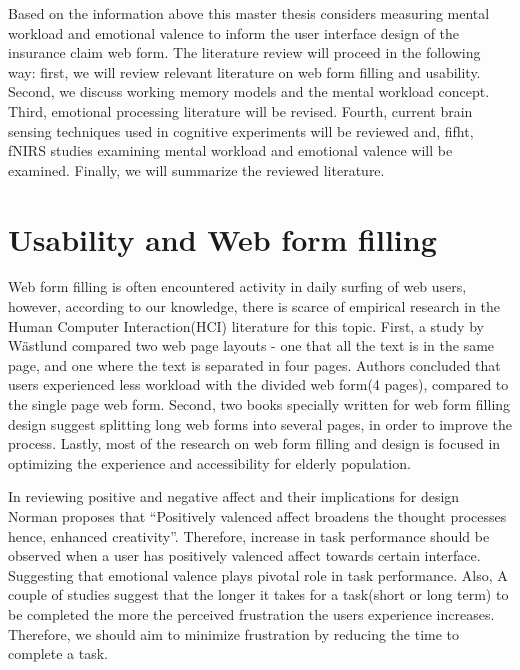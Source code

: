\documentclass[a4paper]{report}
\begin{document}
	Based on the information above this master thesis considers measuring mental workload and emotional valence to inform the user interface design of the insurance claim web form. The literature review will proceed in the following way: first, we will review relevant literature on web form filling and usability. Second, we discuss working memory models and the mental workload concept. Third, emotional processing literature will be revised. Fourth, current brain sensing techniques used in cognitive experiments will be reviewed and, fifht, fNIRS studies examining mental workload and emotional valence will be examined. Finally, we will summarize the reviewed literature. 
	
	\section{Usability and Web form filling}	
		Web form filling is often encountered activity in daily surfing of web users, however, according to our knowledge, there is scarce of empirical research in the Human Computer Interaction(HCI) literature for this topic. First, a study by Wästlund\cite{Wastlund20081229} compared two web page layouts - one that all the text is in the same page, and one where the text is separated in four pages. Authors concluded that users experienced less workload with the divided web form(4 pages), compared to the single page web form. Second, two books specially written for web form filling design\cite{jarrett2009forms,wroblewski2008web} suggest splitting long web forms into several pages, in order to improve the process. Lastly, most of the research on web form filling and design is focused in optimizing the experience and accessibility for elderly population\cite{sayago2012selective,chadwick2003web,lines2006online,sayago2007some}.
		
		In reviewing positive and negative affect and their implications for design Norman\cite{norman2002emotion} proposes that ``Positively valenced affect broadens the thought processes hence, enhanced creativity''. Therefore, increase in task performance should be observed when a user has positively valenced affect towards certain interface. Suggesting that emotional valence plays pivotal role in task performance. Also, A couple of studies suggest that the longer it takes for a task(short or long term) to be completed the more the perceived frustration the users experience increases\cite{mendoza2005usability,bessiere2004social}. Therefore, we should aim to minimize frustration by reducing the time to complete a task.
			
\end{document}
